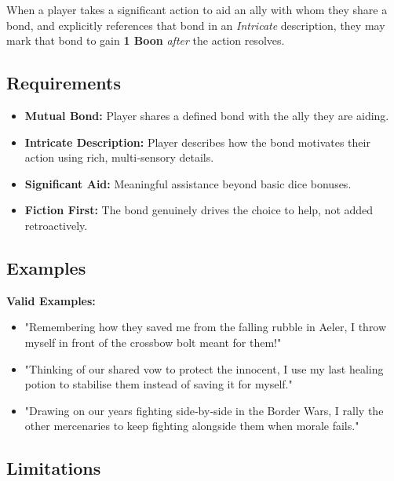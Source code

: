 When a player takes a significant action to aid an ally with whom they share a bond, and explicitly references that bond in an \emph{Intricate} description, they may mark that bond to gain \textbf{1 Boon} \emph{after} the action resolves.

\subsection{Requirements}\label{subsec:bond_requirements}

\begin{itemize}
    \item \textbf{Mutual Bond:} Player shares a defined bond with the ally they are aiding.
    \item \textbf{Intricate Description:} Player describes how the bond motivates their action using rich, multi‑sensory details.
    \item \textbf{Significant Aid:} Meaningful assistance beyond basic dice bonuses.
    \item \textbf{Fiction First:} The bond genuinely drives the choice to help, not added retroactively.
\end{itemize}

\subsection{Examples}\label{subsec:bond_examples}

\textbf{Valid Examples:}
\begin{itemize}
    \item "Remembering how they saved me from the falling rubble in Aeler, I throw myself in front of the crossbow bolt meant for them!"
    \item "Thinking of our shared vow to protect the innocent, I use my last healing potion to stabilise them instead of saving it for myself."
    \item "Drawing on our years fighting side‑by‑side in the Border Wars, I rally the other mercenaries to keep fighting alongside them when morale fails."
\end{itemize}

\subsection{Limitations}\label{subsec:bond_limitations}

